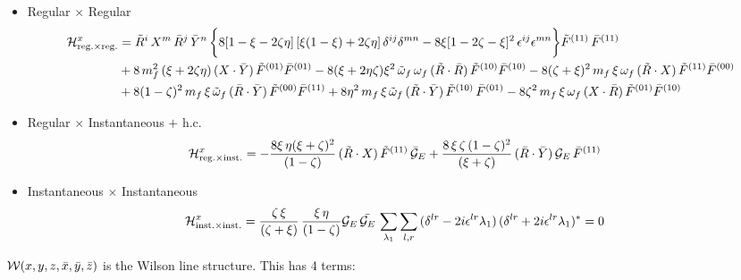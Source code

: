 \documentclass[9pt]{article}
\numberwithin{equation}{section}
\begin{document}
\begin{itemize}
    \item Regular $\times$ Regular
    \begin{align}
    \mathcal{H}^{x}_{\mathrm{reg.}\times \mathrm{reg.}} & = \Tilde{R}^{i}\,X^{m}\,\Bar{R}^{j}\,\Bar{Y}^{n}\,\bigg\{8[1-\xi-2\zeta\eta]\,[\xi(1-\xi) + 2\zeta\eta]\,\delta^{ij}\delta^{mn}-8\xi[1-2\zeta-\xi]^{2}\,\epsilon^{ij}\epsilon^{mn}\bigg\}\Tilde{F}^{(11)}\,\Bar{F}^{(11)}\notag \\ & +8\,m^{2}_{f}\,(\xi +2\zeta\eta)\, (X\cdot \Bar{Y})\,\Tilde{F}^{(01)}\Bar{F}^{(01)} - 8(\xi + 2\eta\zeta)\xi^{2}\,\Tilde{\omega}_{f}\,\omega_{f}\,(\Tilde{R}\cdot\Bar{R})\,\Tilde{F}^{(10)}\Bar{F}^{(10)} - 8(\zeta + \xi)^{2}\,m_{f}\,\xi\,\omega_{f}\,(\Tilde{R}\cdot X)\,\Tilde{F}^{(11)}\Bar{F}^{(00)}\notag \\ & + 8(1-\zeta)^{2}\,m_{f}\,\xi\,\Tilde{\omega}_{f}\,(\Bar{R}\cdot \Bar{Y})\,\Tilde{F}^{(00)}\Bar{F}^{(11)} +8\eta^{2}\,m_{f}\,\xi\, \Tilde{\omega}_{f}\,(\Tilde{R}\cdot \Bar{Y})\,\Tilde{F}^{(10)}\,\Bar{F}^{(01)}-8\zeta^{2}\,m_{f}\,\xi\,\omega_{f}\,(X\cdot \Bar{R})\,\Tilde{F}^{(01)}\Bar{F}^{(10)}
    \end{align}
    \item Regular $\times$ Instantaneous $+$ h.c.
    \begin{align}
    \mathcal{H}^{x}_{\mathrm{reg.}\times \mathrm{inst.}} & = -\frac{8\xi\,\eta (\xi +\zeta)^{2}}{(1-\zeta)}\,(\Tilde{R}\cdot X)\,\Tilde{F}^{(11)}\,\Bar{\mathcal{G}}_{E} + \frac{8\,\xi\,\zeta\,(1-\zeta)^{2}}{(\xi + \zeta)}\,(\Bar{R}\cdot \Bar{Y})\,\mathcal{G}_{E}\,\Bar{F}^{(11)}
    \end{align}
\item Instantaneous $\times$ Instantaneous
    \begin{align}
    \mathcal{H}^{x}_{\mathrm{inst.}\times \mathrm{inst.}} & = \frac{\zeta\,\xi}{(\zeta + \xi)}\,\frac{\xi\,\eta}{(1-\zeta)}\mathcal{G}_{E}\,\Bar{\mathcal{G}_{E}}\,\sum_{\lambda_{1}}\sum_{l,r}\,(\delta^{lr}-2i\epsilon^{lr}\lambda_{1})\,(\delta^{lr}+2i\epsilon^{lr}\lambda_{1})^{*} = 0
    \end{align}
\end{itemize}
$\mathcal{W}(x,y,z,\Bar{x},\Bar{y},\Bar{z})$ is the Wilson line structure. This has 4 terms:
\end{document}
